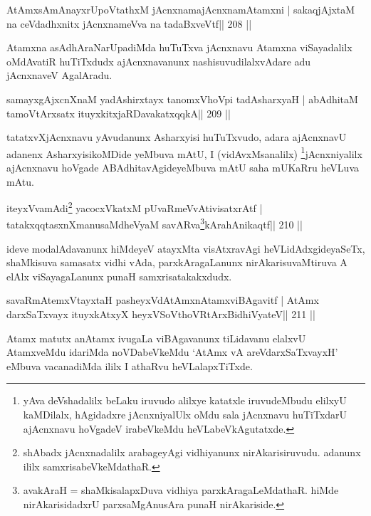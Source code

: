 \begin{shl}
AtAmxsAmAnayxrUpoVtathxM jAcnxnamajAcnxnamAtamxni |
sakaqjAjxtaM na ceVdadhxnitx jAcnxnameVva na tadaBxveVtf\hfill || 208 ||
\end{shl}

\begin{artha}
Atamxna asAdhAraNarUpadiMda huTuTxva jAcnxnavu Atamxna viSayadalilx oMdAvatiR huTiTxdudx ajAcnxnavanunx nashisuvudilalxvAdare adu jAcnxnaveV AgalAradu.
\end{artha}

\begin{shl}
samayxgAjxcnXnaM yadAshirxtayx tanomxVhoV\s pi tadAsharxyaH |
abAdhitaM tamoV\s tArx\s\s satx ituyxkitxjaRDavakatxqqkA\hfill || 209 ||
\end{shl}

\begin{artha}
tatatxvXjAcnxnavu yAvudanunx Asharxyisi huTuTxvudo, adara ajAcnxnavU adanenx AsharxyisikoMDide yeMbuva mAtU, I (vidAvxMsanalilx) \footnote{yAva deVshadalilx beLaku iruvudo alilxye katatxle iruvudeMbudu elilxyU kaMDilalx, hAgidadxre jAcnxniyalUlx oMdu sala jAcnxnavu huTiTxdarU ajAcnxnavu hoVgadeV irabeVkeMdu heVLabeVkAgutatxde.}jAcnxniyalilx ajAcnxnavu hoVgade ABAdhitavAgideyeMbuva mAtU saha mUKaRru heVLuva mAtu.
\end{artha}

\begin{shl}
iteyxVvamAdi\footnote{shAbadx jAcnxnadalilx arabageyAgi vidhiyanunx nirAkarisiruvudu. adanunx ililx samxrisabeVkeMdathaR.} yacocxVkatxM pUvaRmeVvAtivisatxrAtf |
tatakxqqtasxnXmanusaMdheVyaM savARva\footnote{avakAraH = shaMkisalapxDuva vidhiya parxkAragaLeMdathaR. hiMde nirAkarisidadxrU parxsaMgAnusAra punaH nirAkariside.}kArahAnikaqtf\hfill || 210 ||
\end{shl}

\begin{artha}
ideve modalAdavanunx hiMdeyeV atayxMta visAtxravAgi heVLidAdxgideyaSeTx, shaMkisuva samasatx vidhi vAda, parxkAragaLanunx nirAkarisuvaMtiruva A elAlx viSayagaLanunx punaH samxrisatakakxdudx.
\end{artha}

\begin{shl}
savaRmAtemxVtayxtaH pasheyxVdAtAmxnAtamxviBAgavitf |
AtAmx darxSaTxvayx ituyxkAtxyX heyxVSoV\s thoVR\s tArxBidhiVyateV\hfill || 211 ||
\end{shl}

\begin{artha}
Atamx matutx anAtamx ivugaLa viBAgavanunx tiLidavanu elalxvU AtamxveMdu idariMda noVDabeVkeMdu `AtAmx vA areVdarxSaTxvayxH' eMbuva vacanadiMda ililx I athaRvu heVLalapxTiTxde.
\end{artha}

